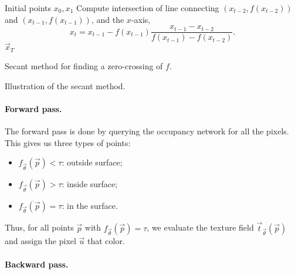 \begin{algorithm}
    \begin{algorithmic}[1]
        \Require Initial points $x_0, x_1$
        \State Compute intersection of line connecting $(x_{t-2}, f(x_{t-2}))$ and $(x_{t-1}, f(x_{t-1}))$, and the $x$-axis, \[
            x_t = x_{t-1} - f(x_{t-1}) \frac{x_{t-1} - x_{t-2}}{f(x_{t-1}) - f(x_{t-2})}.
        \]
        \EndFor
        \State \Return $\vec{x}_T$
    \end{algorithmic}
    \caption{Secant method for finding a zero-crossing of $f$.}
    \label{alg:secant}
\end{algorithm}

\begin{marginfigure}
    \centering
    \caption{Illustration of the secant method.}
    \label{fig:secant-method}
\end{marginfigure}

\paragraph{Forward pass.}

The forward pass is done by querying the occupancy network for all the pixels. This gives us three
types of points:
\begin{itemize}
    \item $f_{\vec{\theta}}(\vec{p}) < \tau$: outside surface;
    \item $f_{\vec{\theta}}(\vec{p}) > \tau$: inside surface;
    \item $f_{\vec{\theta}}(\vec{p}) = \tau$: in the surface.
\end{itemize}
Thus, for all points $\vec{p}$ with $f_{\vec{\theta}}(\vec{p}) = \tau$, we evaluate the texture field
$\vec{t}_{\vec{\theta}}(\vec{p})$ and assign the pixel $\vec{u}$ that color.

\paragraph{Backward pass.}

